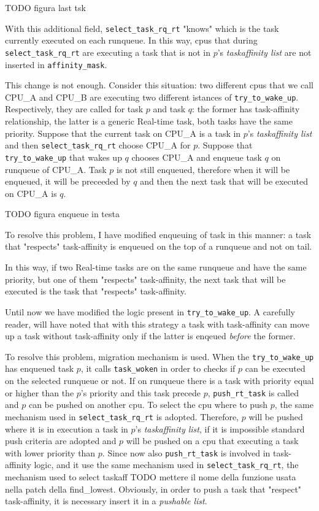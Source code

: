 TODO figura last tsk

With this additional field, \texttt{select\_task\_rq\_rt} "knows" which is the task currently executed on each runqueue. In this way, cpus that during 
\texttt{select\_task\_rq\_rt} are executing a task that is not in $p$'s \textit{taskaffinity list} are not inserted in \texttt{affinity\_mask}.

This change is not enough. Consider this situation: two different cpus that we call CPU\_A and CPU\_B are executing two different istances of 
\texttt{try\_to\_wake\_up}. Respectively, they are called for task $p$ and task $q$: the former has task-affinity relationship, the latter is a generic 
Real-time task, both tasks have the same priority. Suppose that the current task on CPU\_A is a task in $p$'s \textit{taskaffinity list} and then 
\texttt{select\_task\_rq\_rt} choose CPU\_A for $p$. Suppose that \texttt{try\_to\_wake\_up} that wakes up $q$ chooses CPU\_A and enqueue task $q$ on 
runqueue of CPU\_A. Task $p$ is not still enqueued, therefore when it will be enqueued, it will be preceeded by $q$ and then the next task that will
be executed on CPU\_A is $q$.

TODO figura enqueue in testa

To resolve this problem, I have modified enqueuing of task in this manner: a task that "respects" task-affinity is enqueued on the top of a runqueue and not 
on tail. 

In this way, if two Real-time tasks are on the same runqueue and have the same priority, but one of them "respects" task-affinity, the next task that 
will be executed is the task that "respects" task-affinity. 

Until now we have modified the logic present in \texttt{try\_to\_wake\_up}. A carefully reader, will have noted that with this strategy a task with 
task-affinity can move up a task without task-affinity only if the latter is enqeued \textit{before} the former.

To resolve this problem, migration mechanism is used. When the \texttt{try\_to\_wake\_up} has enqueued task $p$, it calls \texttt{task\_woken} in order to
checks if $p$ can be executed on the selected runqueue or not. If on runqueue there is a task with priority equal or higher than the $p$'s priority and 
this task precede $p$, \texttt{push\_rt\_task} is called and $p$ can be pushed on another cpu. To select the cpu where to push $p$, the same mechanism used 
in \texttt{select\_task\_rq\_rt} is adopted. Therefore, $p$ will be pushed where it is in execution a task in $p$'s \textit{taskaffinity list}, if it is 
impossible standard push criteria are adopted and $p$ will be pushed on a cpu that executing a task with lower priority than $p$. Since now also 
\texttt{push\_rt\_task} is involved in task-affinity logic, and it use the same mechanism used in \texttt{select\_task\_rq\_rt},  the mechanism used to 
select taskaff TODO mettere il nome della funzione usata nella patch della find\_lowest. Obviously, in order to push a task that "respect" task-affinity, 
it is necessary insert it in a \textit{pushable list}. 


